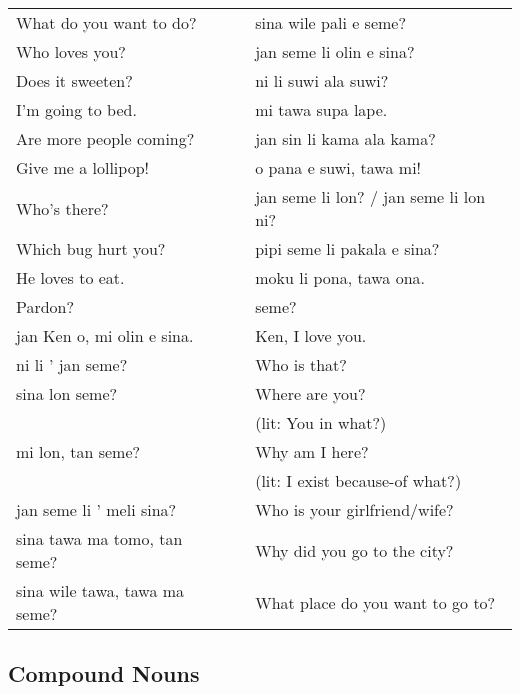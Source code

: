 \begin{supertabular}{p{5,5cm}|ll}
What do you want to do?  && sina wile pali e seme? \\ %
Who loves you?  && jan seme li olin e sina? \\ %
Does it sweeten? && ni li suwi ala suwi? \\ %
I'm going to bed.  && mi tawa supa lape. \\ %
Are more people coming?  && jan sin li kama ala kama? \\ %
Give me a lollipop!  && o pana e suwi, tawa mi! \\ %
Who's there?  && jan seme li lon? / jan seme li lon ni? \\ %
Which bug hurt you?  && pipi seme li pakala e sina? \\ %
He loves to eat.  && moku li pona, tawa ona. \\ %
Pardon? && seme? \\ %
jan Ken o, mi olin e sina.  && Ken, I love you. \\
ni li ' jan seme?  && Who is that? \\
sina lon seme?  && Where are you? \\ 
                &&   (lit: You in what?) \\ %
mi lon, tan seme?  && Why am I here? \\ 
                &&   (lit: I exist because-of what?) \\ %
jan seme li ' meli sina?  && Who is your girlfriend/wife? \\
sina tawa ma tomo, tan seme?  && Why did you go to the city? \\
sina wile tawa, tawa ma seme?  && What place do you want to go to? \\
\end{supertabular} 

\subsection*{Compound Nouns} 
\label{'pi'}

